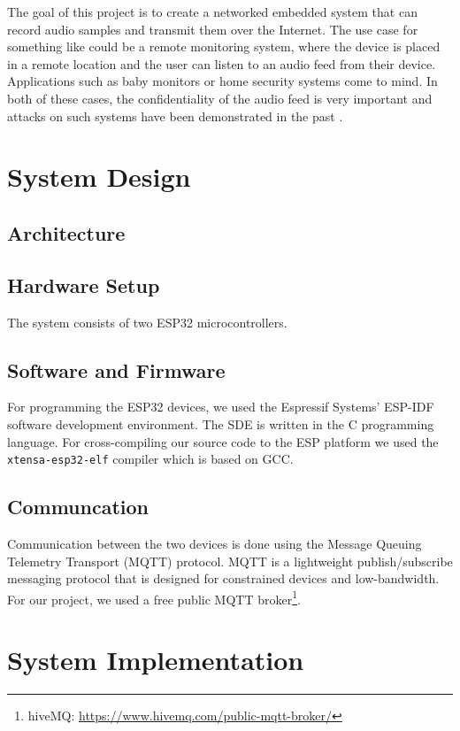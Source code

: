 \documentclass[conference]{IEEEtran}
\begin{document}
The goal of this project is to create a networked embedded system that can record audio samples and transmit them over the Internet.
The use case for something like could be a remote monitoring system, where the device is placed in a remote location and 
the user can listen to an audio feed from their device. Applications such as baby monitors or home security systems come to mind.
In both of these cases, the confidentiality of the audio feed is very important and
attacks on such systems have been demonstrated in the past \cite{BabyMonitorHack, VideoSurvAttacks}.

\section{System Design}
\label{sec:system_design}

\subsection{Architecture}
\subsection{Hardware Setup}
The system consists of two ESP32\cite{ESP32_Manual} microcontrollers.
\subsection{Software and Firmware}

For programming the ESP32 devices, we used the Espressif Systems' ESP-IDF\cite{ESP-IDF}
software development environment. The SDE is written in the C programming 
language. For cross-compiling our source code to the ESP platform we used the 
\texttt{xtensa-esp32-elf} compiler which is based on GCC.


\subsection{Communcation}

Communication between the two devices is done using the Message Queuing Telemetry Transport (MQTT) protocol\cite{MQTT_Survey}.
MQTT is a lightweight publish/subscribe messaging protocol that is designed for constrained devices and low-bandwidth.
For our project, we used a free public MQTT broker\footnote{hiveMQ: \url{https://www.hivemq.com/public-mqtt-broker/}}.

\section{System Implementation}
\label{sec:system_implementation}
\end{document}
